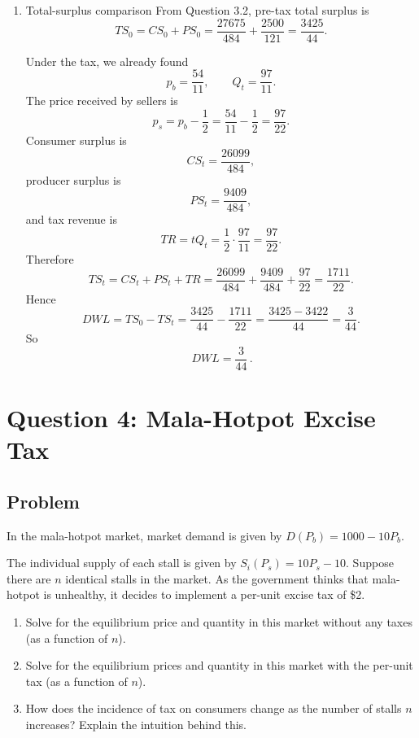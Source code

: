 \documentclass[12pt]{article}
\begin{document}
\begin{enumerate}[label=(\alph*)]
    \item Total-surplus comparison
From Question 3.2, pre-tax total surplus is
\[
TS_0=CS_0+PS_0=\frac{27675}{484}+\frac{2500}{121}=\frac{3425}{44}.
\]

Under the tax, we already found
\[
p_b=\frac{54}{11},\qquad Q_t=\frac{97}{11}.
\]
The price received by sellers is
\[
p_s=p_b-\frac{1}{2}=\frac{54}{11}-\frac{1}{2}=\frac{97}{22}.
\]
Consumer surplus is
\[
CS_t=\frac{26099}{484},
\]
producer surplus is
\[
PS_t=\frac{9409}{484},
\]
and tax revenue is
\[
TR=tQ_t=\frac{1}{2}\cdot \frac{97}{11}=\frac{97}{22}.
\]
Therefore
\[
TS_t=CS_t+PS_t+TR
=\frac{26099}{484}+\frac{9409}{484}+\frac{97}{22}
=\frac{1711}{22}.
\]
Hence
\[
DWL=TS_0-TS_t
=\frac{3425}{44}-\frac{1711}{22}
=\frac{3425-3422}{44}
=\frac{3}{44}.
\]
So
\[
\boxed{\,DWL=\frac{3}{44}\,.}
\]
\end{enumerate}

\newpage

\newpage
\section{Question 4: Mala-Hotpot Excise Tax}

\subsection{Problem}
\noindent
In the mala-hotpot market, market demand is given by \(D(P_b) = 1000 - 10P_b\).

The individual supply of each stall is given by \(S_i(P_s) = 10P_s - 10\). Suppose there are \(n\) identical stalls in the market. As the government thinks that mala-hotpot is unhealthy, it decides to implement a per-unit excise tax of \$2.
\begin{enumerate}[label=(\alph*), leftmargin=*]
  \item Solve for the equilibrium price and quantity in this market without any taxes (as a function of \(n\)).
  \item Solve for the equilibrium prices and quantity in this market with the per-unit tax (as a function of \(n\)).
  \item How does the incidence of tax on consumers change as the number of stalls \(n\) increases? Explain the intuition behind this.
\end{enumerate}
\end{document}
